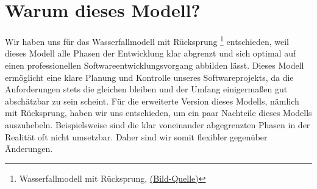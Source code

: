 \section{Warum dieses Modell?}
Wir haben uns für das Wasserfallmodell mit Rücksprung
\footnote{Wasserfallmodell mit Rücksprung, \href{http://upload.wikimedia.org/wikipedia/commons/thumb/e/e5/Wasserfallmodell.svg/567px-Wasserfallmodell.svg.png}{(Bild-Quelle)}}
entschieden, weil dieses Modell alle Phasen der 
Entwicklung klar abgrenzt und sich optimal auf einen professionellen Softwareentwicklungsvorgang
abbilden lässt. Dieses Modell ermöglicht eine klare Planung und Kontrolle unseres Softwareprojekts,
da die Anforderungen stets die gleichen bleiben und der Umfang einigermaßen gut abschätzbar zu sein scheint.
Für die erweiterte Version dieses Modells, nämlich mit Rücksprung, haben wir uns entschieden, um ein 
paar Nachteile dieses Modells auszuhebeln. Beispielsweise sind die klar voneinander abgegrenzten Phasen
in der Realität oft nicht umsetzbar. Daher sind wir somit flexibler gegenüber Änderungen.
